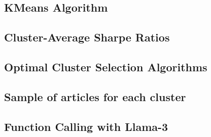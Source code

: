 \subsection{KMeans Algorithm} \label{sec:A1}


\newpage


\newpage
\subsection{Cluster-Average Sharpe Ratios}


\newpage
\subsection{Optimal Cluster Selection Algorithms}



\subsection{Sample of articles for each cluster}


\subsection{Function Calling with Llama-3}






